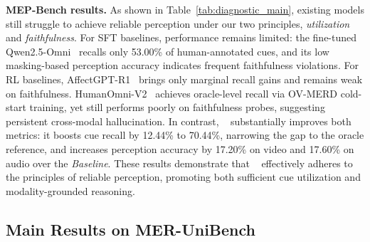 \documentclass{article}
\theoremstyle{plain}
\theoremstyle{definition}
\theoremstyle{remark}
\begin{document}
\noindent\textbf{MEP-Bench results.}
As shown in Table~\ref{tab:diagnostic_main}, existing models still struggle to achieve reliable perception under our two principles, \emph{utilization} and \emph{faithfulness}. 
For SFT baselines, performance remains limited: the fine-tuned Qwen2.5-Omni~\cite{xu2025qwen2} recalls only 53.00\% of human-annotated cues, and its low masking-based perception accuracy indicates frequent faithfulness violations.
For RL baselines, AffectGPT-R1~\cite{lian2025affectgptr1} brings only marginal recall gains and remains weak on faithfulness. HumanOmni-V2~\cite{yang2025humanomniv2} achieves oracle-level recall via OV-MERD cold-start training, yet still performs poorly on faithfulness probes, suggesting persistent cross-modal hallucination.
In contrast, \ourmethod~ substantially improves both metrics: it boosts cue recall by 12.44\% to 70.44\%, narrowing the gap to the oracle reference, and increases perception accuracy by 17.20\% on video and 17.60\% on audio over the \textit{Baseline}. These results demonstrate that \ourmethod~ effectively adheres to the principles of reliable perception, promoting both sufficient cue utilization and modality-grounded reasoning.







\subsection{Main Results on MER-UniBench}
\label{sec:main_results}
\end{document}
